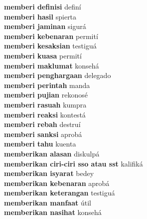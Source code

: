 \textbf{ memberi definisi  } definí \\
\textbf{ memberi hasil  } spierta \\
\textbf{ memberi jaminan  } sigurá \\
\textbf{ memberi kebenaran  } permití \\
\textbf{ memberi kesaksian  } testiguá \\
\textbf{ memberi kuasa  } permití \\
\textbf{ memberi maklumat  } konsehá \\
\textbf{ memberi penghargaan  } delegado \\
\textbf{ memberi perintah  } manda \\
\textbf{ memberi pujian  } rekonosé \\
\textbf{ memberi rasuah  } kumpra \\
\textbf{ memberi reaksi  } kontestá \\
\textbf{ memberi rebah  } destruí \\
\textbf{ memberi sanksi  } aprobá \\
\textbf{ memberi tahu  } kuenta \\
\textbf{ memberikan alasan  } diskulpá \\
\textbf{ memberikan ciri-ciri sso atau sst  } kalifiká \\
\textbf{ memberikan isyarat  } bedey \\
\textbf{ memberikan kebenaran  } aprobá \\
\textbf{ memberikan keterangan  } testiguá \\
\textbf{ memberikan manfaat  } útil \\
\textbf{ memberikan nasihat  } konsehá \\
